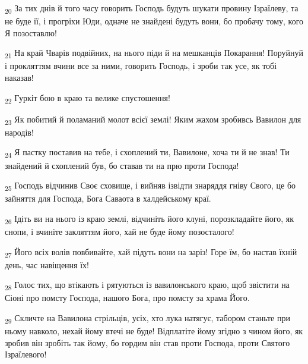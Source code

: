 \begin{tcolorbox}
\textsubscript{20} За тих днів й того часу говорить Господь будуть шукати провину Ізраїлеву, та не буде її, і прогріхи Юди, одначе не знайдені будуть вони, бо пробачу тому, кого Я позоставлю!
\end{tcolorbox}
\begin{tcolorbox}
\textsubscript{21} На край Чварів подвійних, на нього піди й на мешканців Покарання! Поруйнуй і прокляттям вчини все за ними, говорить Господь, і зроби так усе, як тобі наказав!
\end{tcolorbox}
\begin{tcolorbox}
\textsubscript{22} Гуркіт бою в краю та велике спустошення!
\end{tcolorbox}
\begin{tcolorbox}
\textsubscript{23} Як побитий й поламаний молот всієї землі! Яким жахом зробивсь Вавилон для народів!
\end{tcolorbox}
\begin{tcolorbox}
\textsubscript{24} Я пастку поставив на тебе, і схоплений ти, Вавилоне, хоча ти й не знав! Ти знайдений й схоплений був, бо ставав ти на прю проти Господа!
\end{tcolorbox}
\begin{tcolorbox}
\textsubscript{25} Господь відчинив Своє сховище, і вийняв ізвідти знаряддя гніву Свого, це бо зайняття для Господа, Бога Саваота в халдейському краї.
\end{tcolorbox}
\begin{tcolorbox}
\textsubscript{26} Ідіть ви на нього із краю землі, відчиніть його клуні, порозкладайте його, як снопи, і вчиніте закляттям його, хай не буде йому позосталого!
\end{tcolorbox}
\begin{tcolorbox}
\textsubscript{27} Його всіх волів повбивайте, хай підуть вони на заріз! Горе їм, бо настав їхній день, час навіщення їх!
\end{tcolorbox}
\begin{tcolorbox}
\textsubscript{28} Голос тих, що втікають і рятуються із вавилонського краю, щоб звістити на Сіоні про помсту Господа, нашого Бога, про помсту за храма Його.
\end{tcolorbox}
\begin{tcolorbox}
\textsubscript{29} Скличте на Вавилона стрільців, усіх, хто лука натягує, табором станьте при ньому навколо, нехай йому втечі не буде! Відплатіте йому згідно з чином його, як зробив він зробіть так йому, бо гордим він став проти Господа, проти Святого Ізраїлевого!
\end{tcolorbox}
